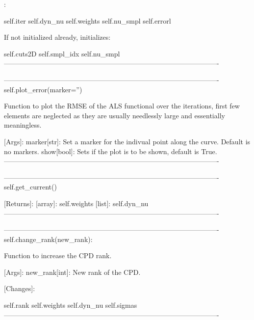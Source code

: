 \begin{DoxyVerb}
          [Changes]:
                   
                self.iter
                self.dyn_nu
                self.weights
                self.nu_smpl
                self.errorl

          If not initialized already, initializes:
                
                self.cuts2D
                self.smpl_idx
                self.nu_smpl
       ----------------------------------------------------------------------------------------------         
                
       ----------------------------------------------------------------------------------------------                    
        self.plot_error(marker='')
        
            Function to plot the RMSE of the ALS functional over the iterations, first few elements
            are neglected as they are usually needlessly large and essentially meaningless.
            
            [Args]:
                    marker[str]: Set a marker for the indivual point along the curve. Default is
                                no markers.
                    show[bool]:  Sets if the plot is to be shown, default is True.
       ---------------------------------------------------------------------------------------------- 
        
       ----------------------------------------------------------------------------------------------           
        self.get_current()
           
           [Returns]:
                   [array]: self.weights
                   [list]: self.dyn_nu
       ---------------------------------------------------------------------------------------------- 
       
       ----------------------------------------------------------------------------------------------                        
        self.change_rank(new_rank):
        
            Function to increase the CPD rank.
            
            [Args]:
                    new_rank[int]: New rank of the CPD.
                    
            [Changes]:
                
                self.rank
                self.weights
                self.dyn_nu
                self.sigmas
       ---------------------------------------------------------------------------------------------- 
       

\end{DoxyVerb}

